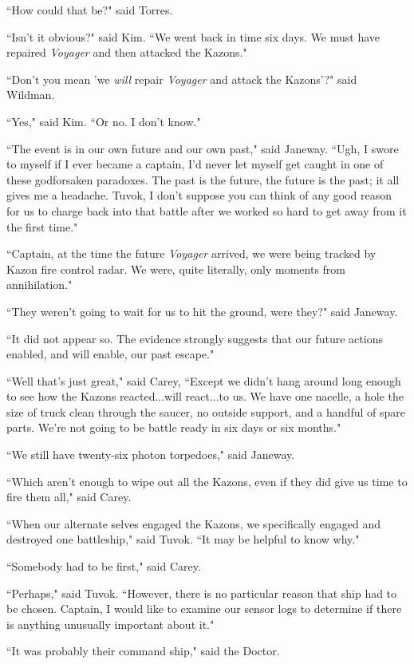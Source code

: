 \documentclass[twoside,letterpaper,12pt]{memoir}
\begin{document}
``How could that be?" said Torres. 

``Isn't it obvious?" said Kim. ``We went back in time six days. We must have repaired \textit{Voyager} and then attacked the Kazons." 

``Don't you mean 'we \textit{will} repair \textit{Voyager} and attack the Kazons'?" said Wildman. 

``Yes," said Kim. ``Or no. I don't know." 

``The event is in our own future and our own past," said Janeway. ``Ugh, I swore to myself if I ever became a captain, I'd never let myself get caught in one of these godforsaken paradoxes. The past is the future, the future is the past; it all gives me a headache. Tuvok, I don't suppose you can think of any good reason for us to charge back into that battle after we worked so hard to get away from it the first time." 

``Captain, at the time the future \textit{Voyager} arrived, we were being tracked by Kazon fire control radar. We were, quite literally, only moments from annihilation." 

``They weren't going to wait for us to hit the ground, were they?" said Janeway. 

``It did not appear so. The evidence strongly suggests that our future actions enabled, and will enable, our past escape." 

``Well that's just great," said Carey, ``Except we didn't hang around long enough to see how the Kazons reacted...will react...to us. We have one nacelle, a hole the size of truck clean through the saucer, no outside support, and a handful of spare parts. We're not going to be battle ready in six days or six months." 

``We still have twenty-six photon torpedoes," said Janeway. 

``Which aren't enough to wipe out all the Kazons, even if they did give us time to fire them all," said Carey. 

``When our alternate selves engaged the Kazons, we specifically engaged and destroyed one battleship," said Tuvok. ``It may be helpful to know why." 

``Somebody had to be first," said Carey. 

``Perhaps," said Tuvok. ``However, there is no particular reason that ship had to be chosen. Captain, I would like to examine our sensor logs to determine if there is anything unusually important about it." 

``It was probably their command ship," said the Doctor. 
\end{document}

